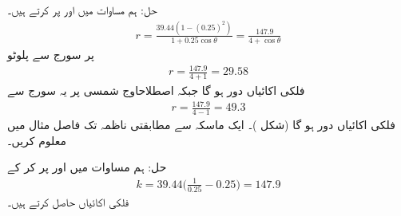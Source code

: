 حل:\quad
ہم  مساوات  میں  اور  پر کرتے ہیں۔
\begin{align*}
r=\frac{39.44(1-(0.25)^2)}{1+0.25\cos\theta}=\frac{147.9}{4+\cos\theta}
\end{align*}
 پر سورج سے پلوٹو
\begin{align*}
r=\frac{147.9}{4+1}=29.58
\end{align*}
فلکی اکائیاں دور ہو گا جبکہ اصطلاح{اوج شمسی} پر یہ سورج سے
\begin{align*}
r=\frac{147.9}{4-1}=49.3
\end{align*}
فلکی اکائیاں دور ہو گا (شکل )۔
ایک ماسکہ سے مطابقتی ناظمہ تک فاصل مثال  میں معلوم کریں۔

حل:\quad
ہم مساوات  میں  اور  پر کر کے
\begin{align*}
k=39.44\big(\frac{1}{0.25}-0.25\big)=147.9
\end{align*}
فلکی اکائیاں حاصل کرتے ہیں۔
